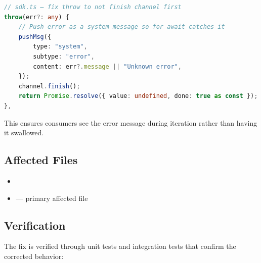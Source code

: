 \begin{lstlisting}[language=TypeScript]
// sdk.ts — fix throw to not finish channel first
throw(err?: any) {
    // Push error as a system message so for await catches it
    pushMsg({
        type: "system",
        subtype: "error",
        content: err?.message || "Unknown error",
    });
    channel.finish();
    return Promise.resolve({ value: undefined, done: true as const });
},

\end{lstlisting}



This ensures consumers see the error message during iteration rather than having it swallowed.


\subsection*{Affected Files}
\begin{itemize}
    \item {}
    \item {} — primary affected file
\end{itemize}

\subsection*{Verification}
The fix is verified through unit tests and integration tests that confirm the corrected behavior:

